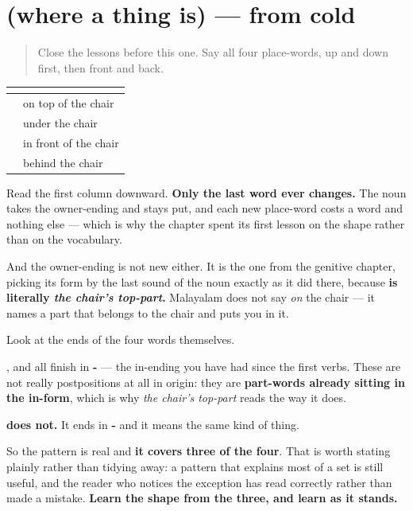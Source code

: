 \section[(where a thing is)]{(where a thing is) — from cold}

\label{lesson:ML-R84-place-recall}



\begin{quote}
Close the lessons before this one. Say all four place-words, up and down first, then front and back.
\end{quote}

\begin{grammarlens}[title={Grammar Lens: one shape, four fillers}]
\noindent
\begin{tabularx}{\linewidth}{@{}>{\raggedright\arraybackslash}X>{\raggedright\arraybackslash}X@{}}
\toprule
\textbf{} & \textbf{} \\
\midrule
\textbf{\ml{കസേരയുടെ} \ml{മുകളിൽ}} & on top of the chair \\
\textbf{\ml{കസേരയുടെ} \ml{താഴെ}} & under the chair \\
\textbf{\ml{കസേരയുടെ} \ml{മുന്നിൽ}} & in front of the chair \\
\textbf{\ml{കസേരയുടെ} \ml{പിന്നിൽ}} & behind the chair \\
\bottomrule
\end{tabularx}

Read the first column downward. \textbf{Only the last word ever changes.} The noun takes the owner-ending and stays put, and each new place-word costs a word and nothing else — which is why the chapter spent its first lesson on the shape rather than on the vocabulary.

And the owner-ending is not new either. It is the one from the genitive chapter, picking its form by the last sound of the noun exactly as it did there, because \textbf{  is literally \emph{the chair's top-part}.} Malayalam does not say \emph{on} the chair — it names a part that belongs to the chair and puts you in it.
\end{grammarlens}

\begin{culture}
Look at the ends of the four words themselves.

\textbf{}, \textbf{} and \textbf{} all finish in \textbf{-} — the in-ending you have had since the first verbs. These are not really postpositions at all in origin: they are \textbf{part-words already sitting in the in-form}, which is why \emph{the chair's top-part} reads the way it does.

\textbf{ does not.} It ends in \textbf{-} and it means the same kind of thing.

So the pattern is real and \textbf{it covers three of the four}. That is worth stating plainly rather than tidying away: a pattern that explains most of a set is still useful, and the reader who notices the exception has read correctly rather than made a mistake. \textbf{Learn the shape from the three, and learn  as it stands.}
\end{culture}

